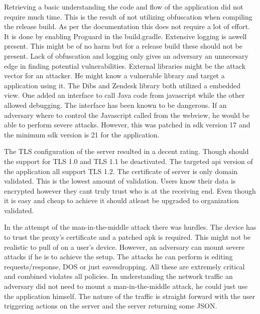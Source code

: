 Retrieving a basic understanding the code and flow of the application did not require much time. This is the result of not utilizing obfuscation when compiling the release build. As per the documentation\cite{android-obfuscation} this does not require a lot of effort. It is done by enabling Proguard in the build.gradle. Extensive logging is aswell present. This might be of no harm but for a release build these should not be present. Lack of obfuscation and logging only gives an adversary an unnecesary edge in finding potential vulnerabilities. External libraries might be the attack vector for an attacker. He might know a vulnerable library and target a application using it. The Dibs and Zendesk library both utilized a embedded view. One added an interface to call Java code from javascript while the other allowed debugging. The interface has been known to be dangerous. If an adversary where to control the Javascript called from the webview, he would be able to perform severe attacks. However, this was patched in sdk version 17 and the minimum sdk version is 21 for the application.

The TLS configuration of the server resulted in a decent rating. Though should the support for TLS 1.0 and TLS 1.1 be deactivated. The targeted api version of the application all support TLS 1.2\cite{android-sslsocket}. The certificate of server is only domain validated. This is the lowest amount of validation. Users know their data is encrypted however they cant truly trust who is at the receiving end. Even though it is easy and cheap to achieve it should atleast be upgraded to organization validated.

In the attempt of the man-in-the-middle attack there was hurdles. The device has to trust the proxy's certificate and a patched apk is required. This might not be realistic to pull of on a user's device. However, an adversary can mount severe attacks if he is to achieve the setup. The attacks he can perform is editing requests/response, DOS or just eavesdropping. All these are extremely critical and combined violates all policies. In understanding the network traffic an adversary did not need to mount a man-in-the-middle attack, he could just use the application himself. The nature of the traffic is straight forward with the user triggering actions on the server and the server returning some JSON.

